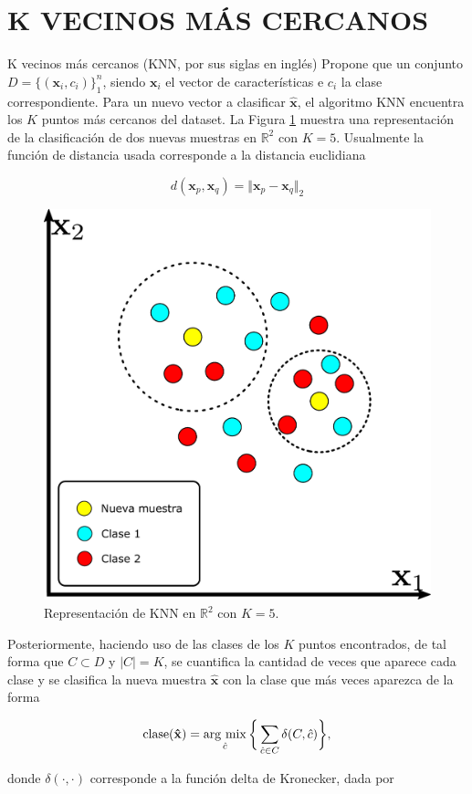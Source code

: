 \section{K VECINOS MÁS CERCANOS}

K vecinos más cercanos (KNN, por sus siglas en inglés) Propone que un conjunto $D = \{(\mathbf{x}_i, c_i)\}_1^n$, siendo $\mathbf{x}_i$ el vector de características e $c_i$ la clase correspondiente. Para un nuevo vector a clasificar $\mathbf{\hat{x}}$, el algoritmo KNN encuentra los $K$ puntos más cercanos del dataset. La Figura \ref{fig:knn} muestra una representación de la clasificación de dos nuevas muestras en $\mathbb{R}^2$ con $K = 5$. Usualmente la función de distancia usada corresponde a la distancia euclidiana

\begin{equation}
    d(\mathbf{x}_p,\mathbf{x}_q) = \Vert \mathbf{x}_p-\mathbf{x}_q \Vert_2
    \label{eq:distancia_euclidiana}
\end{equation}

\begin{figure}[H]
    \centering
    \includegraphics[width=0.4\linewidth]{images/knn.pdf}
    \caption{\hspace{2mm}Representación de KNN en $\mathbb{R}^2$ con $K = 5$.}
    \label{fig:knn}
\end{figure}

Posteriormente, haciendo uso de las clases de los $K$ puntos encontrados, de tal forma que $C \subset D$ y $\vert C \vert = K$, se cuantifica la cantidad de veces que aparece cada clase y se clasifica la nueva muestra $\mathbf{\hat{x}}$ con la clase que más veces aparezca de la forma

\begin{equation}
    \mathrm{clase}(\mathbf{\hat{x}}) =  \operatorname*{arg \ mix}_{\hat{c}} \bigg\{ \sum_{\hat{c} \in C} \delta(C,\hat{c})\bigg\},
\end{equation}

donde $\delta(\cdot,\cdot)$ corresponde a la función delta de Kronecker, dada por

